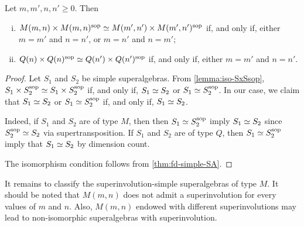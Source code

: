 \begin{prop}
    Let $m,m',n,n' \geq 0$. %
    Then 
    \begin{enumerate}[(i)]
        \item $M(m,n) \times M(m,n)^{\mathrm{sop}} \simeq M(m',n') \times M(m',n')^{\mathrm{sop}}$ if, and only if, either $m = m'$ and $n = n'$, or $m = n'$ and $n = m'$; 
        \item $Q(n) \times Q(n)^{\mathrm{sop}} \simeq Q(n') \times Q(n')^{\mathrm{sop}}$ if, and only if, either $m = m'$ and $n = n'$.
    \end{enumerate}
\end{prop}

\begin{proof}
    Let $S_1$ and $S_2$ be simple superalgebras. 
    From \cref{lemma:iso-SxSsop}, $S_1\times S_2^{\mathrm{sop}} \simeq S_1\times S_2^{\mathrm{sop}}$ if, and only if, $S_1 \simeq S_2$ or $S_1 \simeq S_2^{\mathrm{sop}}$. 
    In our case, we claim that  $S_1 \simeq S_2$ or $S_1 \simeq S_2^{\mathrm{sop}}$ if, and only if, $S_1 \simeq S_2$. 
    
    Indeed, if $S_1$ and $S_2$ are of type $M$, then then $S_1 \simeq S_2^{\mathrm{sop}}$ imply $S_1 \simeq S_2$ since $S_2^{\mathrm{sop}} \simeq S_2$ via supertransposition. 
    If $S_1$ and $S_2$ are of type $Q$, then $S_1 \simeq S_2^{\mathrm{sop}}$ imply that $S_1 \simeq S_2$ by dimension count. 
    
    The isomorphism condition follows from \cref{thm:fd-simple-SA}.
\end{proof}

It remains to classify the superinvolution-simple superalgebras of type $M$. 
It should be noted that $M(m,n)$ does not admit a superinvolution for every values of $m$ and $n$. 
Also, $M(m,n)$ endowed with different superinvolutions may lead to non-isomorphic superalgebras with superinvolution. 

